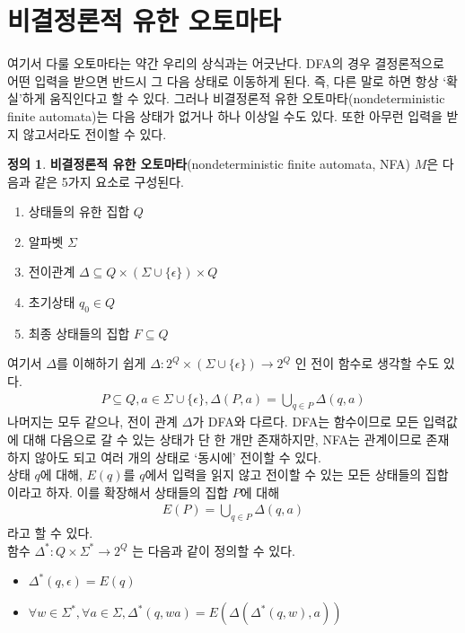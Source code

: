 \documentclass[b5paper, 11pt]{book}
\theoremstyle{definition}
\newtheorem{defn}{정의}[chapter]
\begin{document}
\section{비결정론적 유한 오토마타}
여기서 다룰 오토마타는 약간 우리의 상식과는 어긋난다. DFA의 경우 결정론적으로 어떤 입력을 받으면 반드시 그 다음 상태로 이동하게 된다. 즉, 다른 말로 하면 항상 `확실'하게 움직인다고 할 수 있다. 그러나 비결정론적 유한 오토마타(nondeterministic finite automata)는 다음 상태가 없거나 하나 이상일 수도 있다. 또한 아무런 입력을 받지 않고서라도 전이할 수 있다.
\begin{defn}
    \textbf{비결정론적 유한 오토마타}(nondeterministic finite automata, NFA) $M$은 다음과 같은 5가지 요소로 구성된다.
\begin{enumerate}
    \item 상태들의 유한 집합 $Q$
    \item 알파벳 $\Sigma$
    \item 전이관계 $\Delta \subseteq Q \times (\Sigma \cup \{\epsilon\}) \times Q$
    \item 초기상태 $q_0 \in Q$
    \item 최종 상태들의 집합 $F \subseteq Q$
\end{enumerate}
\end{defn}
여기서 $\Delta$를 이해하기 쉽게 $\Delta: 2^Q \times (\Sigma \cup \{\epsilon\}) \rightarrow 2^{Q}$ 인 전이 함수로 생각할 수도 있다.
\begin{align*}
    P \subseteq Q, a\in \Sigma \cup \{\epsilon\}, \Delta(P, a) = \bigcup_{q\in P}\Delta (q, a)
\end{align*}
나머지는 모두 같으나, 전이 관계 $\Delta$가 DFA와 다르다. DFA는 함수이므로 모든 입력값에 대해 다음으로 갈 수 있는 상태가 단 한 개만 존재하지만, NFA는 관계이므로 존재하지 않아도 되고 여러 개의 상태로 `동시에' 전이할 수 있다.\\
상태 $q$에 대해, $E(q)$를 $q$에서 입력을 읽지 않고 전이할 수 있는 모든 상태들의 집합이라고 하자. 이를 확장해서 상태들의 집합 $P$에 대해 
\begin{align*}
    E(P) = \bigcup_{q\in P} \Delta(q, a)
\end{align*}
라고 할 수 있다. \\
함수 $\Delta^*: Q \times \Sigma^* \rightarrow 2^{Q} $ 는 다음과 같이 정의할 수 있다. 
\begin{itemize}
    \item $\Delta^* (q, \epsilon) = E(q)$
    \item $\forall w \in \Sigma^* ,  \forall a \in \Sigma, \Delta^* (q, wa) = E(\Delta(\Delta^*(q, w), a))$
\end{itemize}
\end{document}
